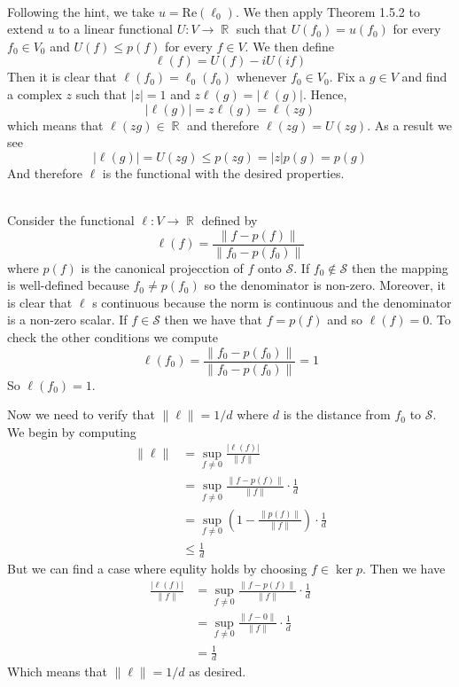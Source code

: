 \documentclass{article}
\DeclareMathOperator{\R}{\mathbb{R}}
\newcommand{\problem}[1]{\noindent{\textbf{Problem #1}}\\}
\newcommand{\norm}[1]{\|#1\|}
\newcommand{\re}[1]{\text{Re}(#1)}
\begin{document}
\problem{1.8.33} Following the hint, we take $u = \re{\ell_0}$. We then apply Theorem 1.5.2 to extend $u$ to a linear functional $U: V \to \R$ such that $U(f_0) = u(f_0)$ for every $f_0 \in V_0$ and $U(f) \leq p(f)$ for every $f \in V$. We then define
\[
\ell(f) = U(f) - iU(if)
\]
Then it is clear that $\ell(f_0) = \ell_0(f_0)$ whenever $f_0 \in V_0$. Fix a $g \in V$ and find a complex $z$ such that $|z| = 1$ and $z\ell(g) = |\ell(g)|$. Hence,
\[
|\ell(g)| = z\ell(g) = \ell(zg)
\]
which means that $\ell(zg) \in \R$ and therefore $\ell(zg) = U(zg)$. As a result we see
\[
|\ell(g)| = U(zg) \leq p(zg) = |z|p(g) = p(g)
\]
And therefore $\ell$ is the functional with the desired properties. 

\problem{1.8.34} Consider the functional $\ell: V \to \R$ defined by 
\[
\ell(f) = \frac{\norm{f - p(f)}}{\norm{f_0 - p(f_0)}}
\]
where $p(f)$ is the canonical projecction of $f$ onto $\mathcal{S}$. If $f_0 \not\in \mathcal{S}$ then the mapping is well-defined because $f_0 \neq p(f_0)$ so the denominator is non-zero. Moreover, it is clear that $\ell$ s continuous because the norm is continuous and the denominator is a non-zero scalar. If $f \in \mathcal{S}$ then we have that $f = p(f)$ and so $\ell(f) = 0$. To check the other conditions we compute
\[
\ell(f_0) = \frac{\norm{f_0 - p(f_0)}}{\norm{f_0 - p(f_0)}} = 1
\]
So $\ell(f_0) = 1$. 

Now we need to verify that $\norm{\ell} = 1/d$ where $d$ is the distance from $f_0$ to $\mathcal{S}$. We begin by computing
\begin{align*}
\norm{\ell} &= \sup_{f\neq 0} \frac{|\ell(f)|}{\norm{f}} \\
&= \sup_{f \neq 0} \frac{\norm{f - p(f)}}{\norm{f}} \cdot \frac{1}{d} \\
&= \sup_{f \neq 0} \left(1 - \frac{\norm{p(f)}}{\norm{f}}\right) \cdot \frac{1}{d} \\
&\leq \frac{1}{d}
\end{align*}
But we can find a case where equlity holds by choosing $f \in \ker p$. Then we have
\begin{align*}
\frac{|\ell(f)|}{\norm{f}} &= \sup_{f \neq 0} \frac{\norm{f - p(f)}}{\norm{f}} \cdot \frac{1}{d} \\
&= \sup_{f \neq 0} \frac{\norm{f - 0}}{\norm{f}} \cdot \frac{1}{d} \\
&= \frac{1}{d}
\end{align*}
Which means that $\norm{\ell} = 1/d$ as desired. 
\end{document}
